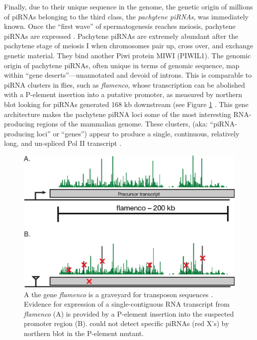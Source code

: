 {    Finally, due to their unique sequence in the genome, the genetic origin of millions of piRNAs belonging to the third class, the \textit{pachytene piRNAs}, was immediately known. Once the ``first wave'' of spermatogenesis \citep{Oakberg1956b, Laiho2013a} reaches meiosis, pachytene piRNAs are expressed \citep{Girard2006, Lau2006, Li2013h}. Pachytene piRNAs are extremely abundant after the pachytene stage of meiosis I when chromosomes pair up, cross over, and exchange genetic material. They bind another Piwi protein MIWI (PIWIL1). The genomic origin of pachytene piRNAs, often unique in terms of genomic sequence, map within ``gene deserts''---unannotated and devoid of introns. This is comparable to piRNA clusters in flies, such as \textit{flamenco}, whose transcription can be abolished with a P-element insertion into a putative promoter, as measured by northern blot looking for piRNAs generated 168 kb downstream (see Figure \ref{Intro:fig:flamenco} \citep{Brennecke2007,Goriaux2014}. This gene architecture makes the pachytene piRNA loci some of the most interesting RNA-producing regions of the mammalian genome. These clusters, (aka: ``piRNA-producing loci'' or ``genes'') appear to produce a single, continuous, relatively long, and un-spliced Pol II transcript \citep{Li2013h}. 

    \begin{figure} %
      \centering 
      \includegraphics{Figures/Intro/FlamencoLocus.eps}
      \caption[Genetic evidence for long, continuous fly piRNA precursor transcripts]
      {
        A the \flies{} gene \textit{flamenco} is a graveyard for transposon sequences \citep{Pelisson1994}. Evidence for expression of a single-contiguous RNA transcript from \textit{flamenco} (A) is provided by a P-element insertion into the suspected promoter region (B). \citep{Brennecke2007} could not detect specific piRNAs (red X's) by northern blot in the P-element mutant.
        }
      \label{Intro:fig:flamenco}
      \end{figure}

}
